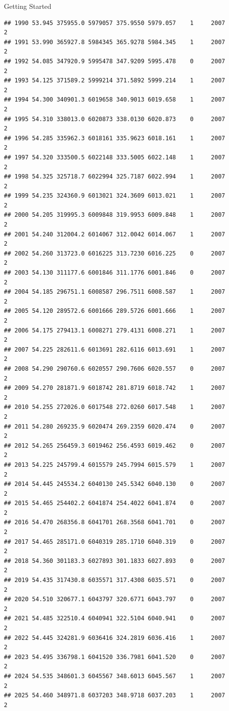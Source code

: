 \documentclass[
  ignorenonframetext,
]{beamer}
\begin{document}
\begin{frame}[fragile]{Getting Started}
\begin{verbatim}
## 1990 53.945 375955.0 5979057 375.9550 5979.057    1     2007        2
## 1991 53.990 365927.8 5984345 365.9278 5984.345    1     2007        2
## 1992 54.085 347920.9 5995478 347.9209 5995.478    0     2007        2
## 1993 54.125 371589.2 5999214 371.5892 5999.214    1     2007        2
## 1994 54.300 340901.3 6019658 340.9013 6019.658    1     2007        2
## 1995 54.310 338013.0 6020873 338.0130 6020.873    0     2007        2
## 1996 54.285 335962.3 6018161 335.9623 6018.161    1     2007        2
## 1997 54.320 333500.5 6022148 333.5005 6022.148    1     2007        2
## 1998 54.325 325718.7 6022994 325.7187 6022.994    1     2007        2
## 1999 54.235 324360.9 6013021 324.3609 6013.021    1     2007        2
## 2000 54.205 319995.3 6009848 319.9953 6009.848    1     2007        2
## 2001 54.240 312004.2 6014067 312.0042 6014.067    1     2007        2
## 2002 54.260 313723.0 6016225 313.7230 6016.225    0     2007        2
## 2003 54.130 311177.6 6001846 311.1776 6001.846    0     2007        2
## 2004 54.185 296751.1 6008587 296.7511 6008.587    1     2007        2
## 2005 54.120 289572.6 6001666 289.5726 6001.666    1     2007        2
## 2006 54.175 279413.1 6008271 279.4131 6008.271    1     2007        2
## 2007 54.225 282611.6 6013691 282.6116 6013.691    1     2007        2
## 2008 54.290 290760.6 6020557 290.7606 6020.557    0     2007        2
## 2009 54.270 281871.9 6018742 281.8719 6018.742    1     2007        2
## 2010 54.255 272026.0 6017548 272.0260 6017.548    1     2007        2
## 2011 54.280 269235.9 6020474 269.2359 6020.474    0     2007        2
## 2012 54.265 256459.3 6019462 256.4593 6019.462    0     2007        2
## 2013 54.225 245799.4 6015579 245.7994 6015.579    1     2007        2
## 2014 54.445 245534.2 6040130 245.5342 6040.130    0     2007        2
## 2015 54.465 254402.2 6041874 254.4022 6041.874    0     2007        2
## 2016 54.470 268356.8 6041701 268.3568 6041.701    0     2007        2
## 2017 54.465 285171.0 6040319 285.1710 6040.319    0     2007        2
## 2018 54.360 301183.3 6027893 301.1833 6027.893    0     2007        2
## 2019 54.435 317430.8 6035571 317.4308 6035.571    0     2007        2
## 2020 54.510 320677.1 6043797 320.6771 6043.797    0     2007        2
## 2021 54.485 322510.4 6040941 322.5104 6040.941    0     2007        2
## 2022 54.445 324281.9 6036416 324.2819 6036.416    1     2007        2
## 2023 54.495 336798.1 6041520 336.7981 6041.520    0     2007        2
## 2024 54.535 348601.3 6045567 348.6013 6045.567    1     2007        2
## 2025 54.460 348971.8 6037203 348.9718 6037.203    1     2007        2

\end{verbatim}
\end{frame}
\end{document}
